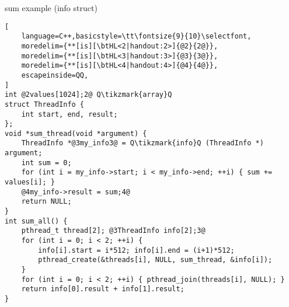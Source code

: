\begin{frame}[fragile,label=sumToStack]{sum example (info struct)}
\begin{lstlisting}[
    language=C++,basicstyle=\tt\fontsize{9}{10}\selectfont,
    moredelim={**[is][\btHL<2|handout:2>]{@2}{2@}},
    moredelim={**[is][\btHL<3|handout:3>]{@3}{3@}},
    moredelim={**[is][\btHL<4|handout:4>]{@4}{4@}},
    escapeinside=QQ,
]
int @2values[1024];2@ Q\tikzmark{array}Q
struct ThreadInfo {
    int start, end, result;
};
void *sum_thread(void *argument) {
    ThreadInfo *@3my_info3@ = Q\tikzmark{info}Q (ThreadInfo *) argument;
    int sum = 0;
    for (int i = my_info->start; i < my_info->end; ++i) { sum += values[i]; }
    @4my_info->result = sum;4@
    return NULL;
}
int sum_all() {
    pthread_t thread[2]; @3ThreadInfo info[2];3@
    for (int i = 0; i < 2; ++i) {
        info[i].start = i*512; info[i].end = (i+1)*512;
        pthread_create(&threads[i], NULL, sum_thread, &info[i]);
    }
    for (int i = 0; i < 2; ++i) { pthread_join(threads[i], NULL); }
    return info[0].result + info[1].result;
}
\end{lstlisting}
\end{frame}
